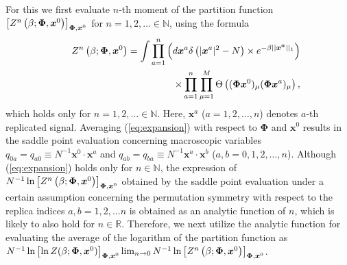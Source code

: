\documentclass[12pt]{iopart}
\newcommand{\vm}[1]{\boldsymbol{#1}}
\begin{document}
For this we first evaluate $n$-th moment of the partition function $\left [Z^n \left(\beta; \vm{\Phi}, \textrm{\boldmath $x$}^{0} \right) \right]_{\vm{\Phi},\vm{x}^0}$ for $n=1,2,\ldots \in \mathbb{N}$, using the formula 
\begin{eqnarray}
&&Z^n \left(\beta; \vm{\Phi}, \textrm{\boldmath $x$}^{0} \right)
=
\int \prod_{a=1}^n \left (d \textrm{\boldmath $x$}^a
\delta\left(\vert \textrm{\boldmath $x$}^a\vert^{2}-N\right) \times
e^{-\beta\vert\vert\textrm{\boldmath $x^a$}\vert\vert _{1}}  \right )\cr
&& \hspace*{4cm} \times 
\prod_{a=1}^n \prod_{\mu=1}^M \Theta\left ( (\vm{\Phi} \vm{x}^0 )_\mu  (\vm{\Phi} \vm{x}^a)_\mu \right ), 
\label{eq:expansion}
\end{eqnarray}
which holds only for $n=1,2,\ldots \in \mathbb{N}$. 
Here, $\vm{x}^a$ ($a=1,2,\ldots,n$) denotes  $a$-th replicated signal. 
Averaging (\ref{eq:expansion}) with respect to $\vm{\Phi}$ and $\vm{x}^0$ results in the saddle point evaluation concerning macroscopic variables $q_{0a} =q_{a0}\equiv N^{-1} \vm{x}^0 \cdot \vm{x}^a$ and $q_{ab}=q_{ba} \equiv N^{-1} \vm{x}^a \cdot \vm{x}^b$ ($a,b =0,1,2,\ldots,n$). %
Although (\ref{eq:expansion}) holds only for $n \in \mathbb{N}$, the expression of $N^{-1} \ln \left [Z^n \left(\beta; \vm{\Phi}, \textrm{\boldmath $x$}^{0} \right) \right]_{\vm{\Phi},\vm{x}^0}$ obtained by the saddle point evaluation under a certain assumption concerning the permutation symmetry with respect to the replica indices $a,b=1,2,\ldots n$ is obtained as an analytic function of $n$, which is likely to also hold for $n \in \mathbb{R}$. Therefore, we next utilize the analytic function for evaluating the average of the logarithm of the partition function as $N^{-1} \ln \left [\ln Z(\beta; \vm{\Phi},\vm{x}^0) \right]_{\vm{\Phi},\vm{x}^0} \lim_{n \to 0} N^{-1} \ln \left [Z^n \left(\beta; \vm{\Phi}, \textrm{\boldmath $x$}^{0} \right) \right]_{\vm{\Phi},\vm{x}^0}$. 
\end{document}
